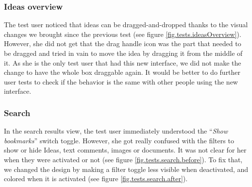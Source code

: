 \documentclass[a4paper,12pt,twoside]{article}
\begin{document}
\subsubsection*{Ideas overview}
The test user noticed that ideas can be dragged-and-dropped thanks to the visual changes we brought since the previous test (see figure \ref{fig.tests.ideasOverview}).
However, she did not get that the drag handle icon was the part that needed to be dragged and tried in vain to move the idea by dragging it from the middle of it.
As she is the only test user that had this new interface, we did not make the change to have the whole box draggable again.
It would be better to do further user tests to check if the behavior is the same with other people using the new interface.



\subsubsection*{Search}
In the search results view, the test user immediately understood the “\emph{Show bookmarks}” switch toggle.
However, she got really confused with the filters to show or hide Ideas, text comments, images or documents.
It was not clear for her when they were activated or not (see figure \ref{fig.tests.search.before}).
To fix that, we changed the design by making a filter toggle less visible when deactivated, and colored when it is activated (see figure \ref{fig.tests.search.after}).
\end{document}
